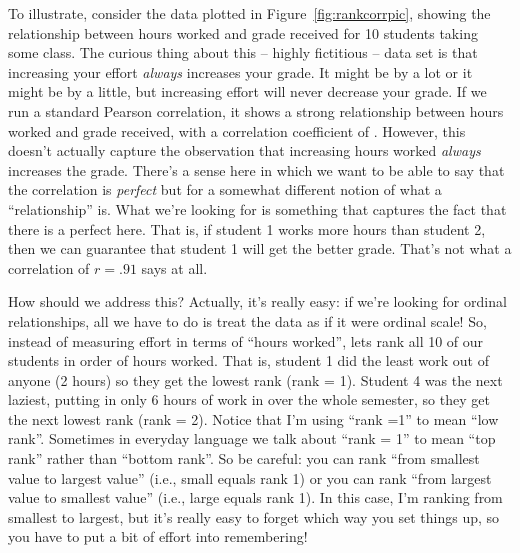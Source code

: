 To illustrate, consider the data plotted in Figure~\ref{fig:rankcorrpic}, showing the relationship between hours worked and grade received for 10 students taking some class. The curious thing about this -- highly fictitious -- data set is that increasing your effort {\it always} increases your grade. It might be by a lot or it might be by a little, but increasing effort will never decrease your grade. If we run a standard Pearson correlation, it shows a strong relationship between hours worked and grade received, with a correlation coefficient of . However, this doesn't actually capture the observation that increasing hours worked {\it always} increases the grade. There's a sense here in which we want to be able to say that the correlation is {\it perfect} but for a somewhat different notion of what a ``relationship'' is. What we're looking for is something that captures the fact that there is a perfect  here. That is, if student 1 works more hours than student 2, then we can guarantee that student 1 will get the better grade. That's not what a correlation of $r = .91$ says at all.

How should we address this? Actually, it's really easy: if we're looking for ordinal relationships, all we have to do is treat the data as if it were ordinal scale! So, instead of measuring effort in terms of ``hours worked'', lets rank all 10 of our students in order of hours worked. That is, student 1 did the least work out of anyone (2 hours) so they get the lowest rank (rank = 1). Student 4 was the next laziest, putting in only  6 hours of work in over the whole semester, so they get the next lowest rank (rank = 2). Notice that I'm using ``rank =1'' to mean ``low rank''. Sometimes in everyday language we talk about ``rank = 1'' to mean ``top rank'' rather than ``bottom rank''. So be careful: you can rank ``from smallest value to largest value'' (i.e., small equals rank 1) or you can rank ``from largest value to smallest value'' (i.e., large equals rank 1). In this case, I'm ranking from smallest to largest, but it's really easy to forget which way you set things up, so you have to put a bit of effort into remembering! 

